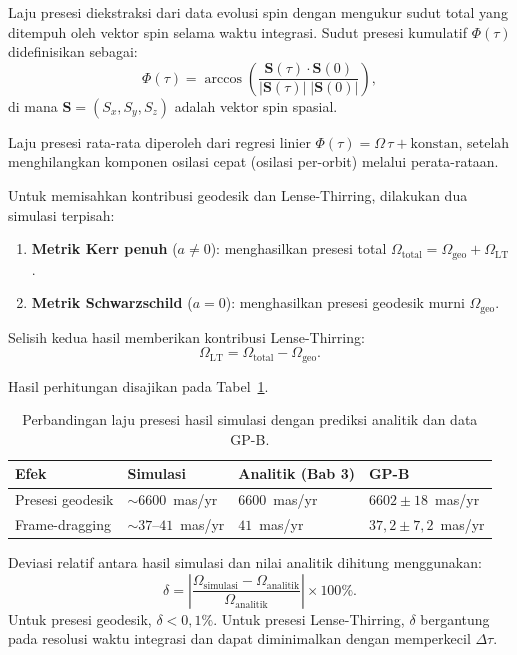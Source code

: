 Laju presesi diekstraksi dari data evolusi spin
dengan mengukur sudut total yang ditempuh oleh vektor spin
selama waktu integrasi.
Sudut presesi kumulatif $\Phi(\tau)$ didefinisikan sebagai:
\begin{equation}
    \Phi(\tau) = \arccos\!\left(\frac{\mathbf{S}(\tau) \cdot \mathbf{S}(0)}{|\mathbf{S}(\tau)|\;|\mathbf{S}(0)|}\right),
    \label{eq:sudut-presesi}
\end{equation}
di mana $\mathbf{S} = (S_x, S_y, S_z)$ adalah vektor spin spasial.

Laju presesi rata-rata diperoleh dari regresi linier
$\Phi(\tau) = \Omega\,\tau + \text{konstan}$,
setelah menghilangkan komponen osilasi cepat
(osilasi per-orbit) melalui perata-rataan.

Untuk memisahkan kontribusi geodesik dan Lense-Thirring,
dilakukan dua simulasi terpisah:
\begin{enumerate}
    \item \textbf{Metrik Kerr penuh} ($a \neq 0$):
          menghasilkan presesi total
          $\Omega_{\text{total}} = \Omega_{\text{geo}} + \Omega_{\text{LT}}$.
    \item \textbf{Metrik Schwarzschild} ($a = 0$):
          menghasilkan presesi geodesik murni
          $\Omega_{\text{geo}}$.
\end{enumerate}
Selisih kedua hasil memberikan kontribusi Lense-Thirring:
\begin{equation}
    \Omega_{\text{LT}} = \Omega_{\text{total}} - \Omega_{\text{geo}}.
    \label{eq:selisih-lt}
\end{equation}

Hasil perhitungan disajikan pada Tabel~\ref{tab:hasil-presesi}.

\begin{table}[ht]
\centering
\caption{Perbandingan laju presesi hasil simulasi dengan prediksi analitik
dan data GP-B.}
\label{tab:hasil-presesi}
\begin{tabular}{llll}
\toprule
\textbf{Efek} & \textbf{Simulasi} & \textbf{Analitik (Bab 3)} & \textbf{GP-B} \\
\midrule
Presesi geodesik & $\sim 6600$~mas/yr & $6600$~mas/yr & $6602 \pm 18$~mas/yr \\
Frame-dragging   & $\sim 37$--$41$~mas/yr & $41$~mas/yr & $37{,}2 \pm 7{,}2$~mas/yr \\
\bottomrule
\end{tabular}
\end{table}

Deviasi relatif antara hasil simulasi dan nilai analitik
dihitung menggunakan:
\begin{equation}
    \delta = \left|\frac{\Omega_{\text{simulasi}} - \Omega_{\text{analitik}}}{\Omega_{\text{analitik}}}\right| \times 100\%.
    \label{eq:deviasi-relatif}
\end{equation}
Untuk presesi geodesik, $\delta < 0{,}1\%$.
Untuk presesi Lense-Thirring, $\delta$ bergantung pada
resolusi waktu integrasi dan dapat diminimalkan
dengan memperkecil $\Delta\tau$.


